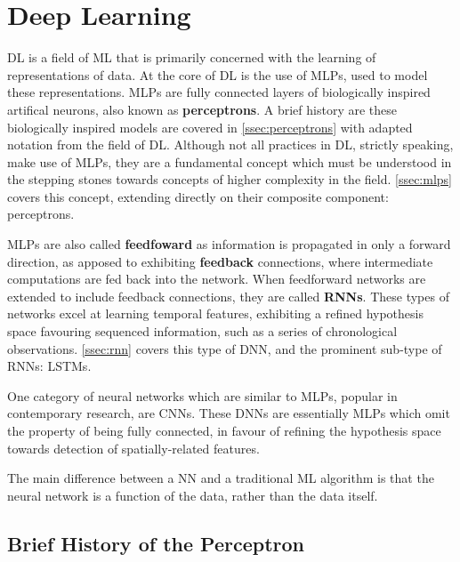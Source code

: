 \section{Deep Learning\label{sec:DL}}
\Gls{DL} is a field of \gls{ML} that is primarily concerned with the learning of
representations of data. At the core of \gls{DL} is the use of \glspl{MLP}, used
to model these representations. \Glspl{MLP} are fully connected layers of
biologically inspired artifical neurons, also known as \textbf{perceptrons}. A
brief history are these biologically inspired models are covered in
\autoref{ssec:perceptrons} with adapted notation from the field of \gls{DL}.
Although not all practices in \gls{DL}, strictly speaking, make use of
\glspl{MLP}, they are a fundamental concept which must be understood in the
stepping stones towards concepts of higher complexity in the field.
\autoref{ssec:mlps} covers this concept, extending directly on their composite
component: perceptrons.

\Glspl{MLP} are also called \textbf{feedfoward} as information is propagated in
only a forward direction, as apposed to exhibiting \textbf{feedback} connections,
where intermediate computations are fed back into the network. When feedforward
networks are extended to include feedback connections, they are called
\textbf{\glspl{RNN}}. These types of networks excel at learning temporal
features, exhibiting a refined hypothesis space favouring sequenced information,
such as a series of chronological observations. \autoref{ssec:rnn} covers this
type of \gls{DNN}, and the prominent sub-type of \glspl{RNN}: \glspl{LSTM}.

One category of neural networks which are similar to \glspl{MLP}, popular in
contemporary research, are \glspl{CNN}. These \glspl{DNN} are essentially
\glspl{MLP} which omit the property of being fully connected, in favour of
refining the hypothesis space towards detection of spatially-related features.

The main difference between a \gls{NN} and a
traditional \gls{ML} algorithm is that the neural network is a function of the
data, rather than the data itself.

\subsection{Brief History of the Perceptron\label{ssec:perceptrons}}

